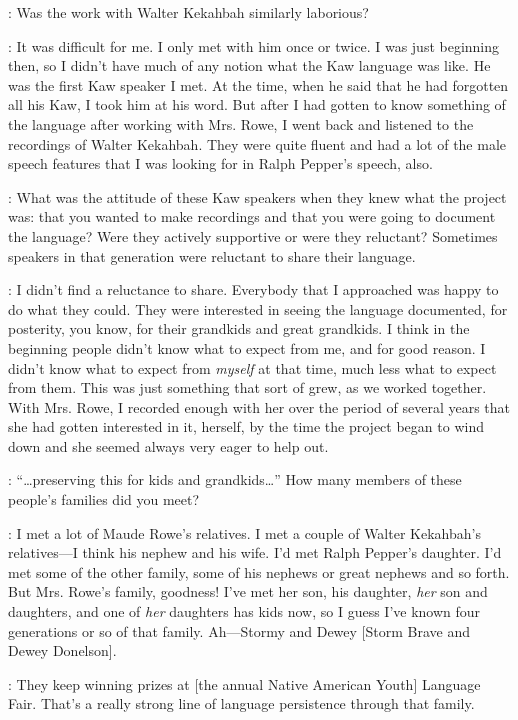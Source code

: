 \documentclass[output=paper]{LSP/langsci}
\begin{document}
: Was the work with Walter Kekahbah similarly laborious?

: It was difficult for me. I only met with him once or twice. I was just beginning then, so I didn't have much of any notion what the Kaw language was like. He was the first Kaw speaker I met. At the time, when he said that he had forgotten all his Kaw, I took him at his word. But after I had gotten to know something of the language after working with Mrs. Rowe, I went back and listened to the recordings of Walter Kekahbah. They were quite fluent and had a lot of the male speech features that I was looking for in Ralph Pepper's speech, also.

: What was the attitude of these Kaw speakers when they knew what the project was: that you wanted to make recordings and that you were going to document the language? Were they actively supportive or were they reluctant? Sometimes speakers in that generation were reluctant to share their language.

: I didn't find a reluctance to share. Everybody that I approached was happy to do what they could. They were interested in seeing the language documented, for posterity, you know, for their grandkids and great grandkids. I think in the beginning people didn't know what to expect from me, and for good reason. I didn't know what to expect from \textit{myself} at that time, much less what to expect from them. This was just something that sort of grew, as we worked together. With Mrs. Rowe, I recorded enough with her over the period of several years that she had gotten interested in it, herself, by the time the project began to wind down and she seemed always very eager to help out.

: ``\ldots preserving this for kids and grandkids\ldots'' How many members of these people's families did you meet?

:  I met a lot of Maude Rowe's relatives. I met a couple of Walter Kekahbah's relatives---I think his nephew and his wife. I'd met Ralph Pepper's daughter. I'd met some of the other family, some of his nephews or great nephews and so forth. But Mrs. Rowe's family, goodness! I've met her son, his daughter, \textit{her} son and daughters, and one of \textit{her} daughters has kids now, so I guess I've known four generations or so of that family. Ah---Stormy and Dewey [Storm Brave and Dewey Donelson].

: They keep winning prizes at [the annual Native American Youth] Language Fair. That's a really strong line of language persistence through that family.
\end{document}
